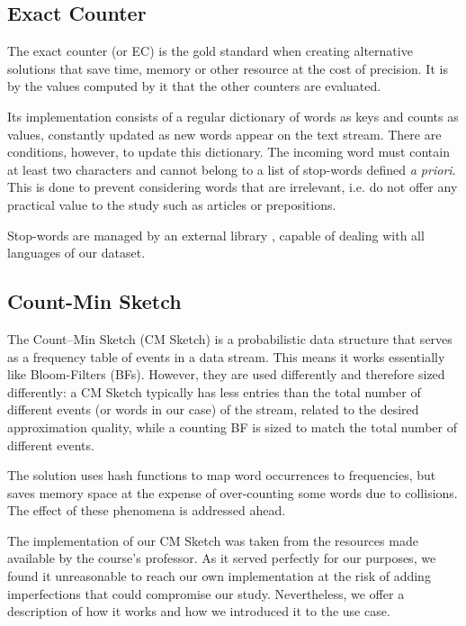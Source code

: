 \documentclass[shortpaper]{revdetua}
\begin{document}
\subsection{Exact Counter}

The exact counter (or EC) is the gold standard when creating alternative solutions that save time, memory or other resource at the cost of precision.
It is by the values computed by it that the other counters are evaluated.

Its implementation consists of a regular dictionary of words as keys and counts as values, constantly updated as new words appear on the text stream.
There are conditions, however, to update this dictionary.
The incoming word must contain at least two characters and cannot belong to a list of stop-words defined \textit{a priori}.
This is done to prevent considering words that are irrelevant, i.e. do not offer any practical value to the study such as articles or prepositions.

Stop-words are managed by an external library \cite{stop-words}, capable of dealing with all languages of our dataset. 

\subsection{Count-Min Sketch}

The Count–Min Sketch (CM Sketch) is a probabilistic data structure that serves as a frequency table of events in a data stream.
This means it works essentially like Bloom-Filters (BFs).
However, they are used differently and therefore sized differently: 
a CM Sketch typically has less entries than the total number of different events (or words in our case) of the stream, related to the desired approximation 
quality, while a counting BF is sized to match the total number of different events. 

The solution uses hash functions to map word occurrences to frequencies, but saves memory space at the expense of over-counting some words due to collisions.
The effect of these phenomena is addressed ahead.

The implementation of our CM Sketch was taken from the resources made available by the course's professor.
As it served perfectly for our purposes, we found it unreasonable to reach our own implementation at the risk of adding imperfections that could compromise our study.
Nevertheless, we offer a description of how it works and how we introduced it to the use case.
\end{document}
